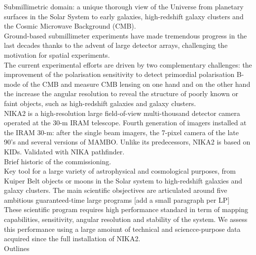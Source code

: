 
Submillimetric domain: a unique thorough view of the Universe from
planetary surfaces in the Solar System to early galaxies,
high-redshift galaxy clusters and the Cosmic Microwave
Background (CMB).\\

Ground-based submillimeter experiments have made tremendous progress in the last
decades thanks to the advent of large detector arrays, challenging the
motivation for spatial experiments.\\

The current experimental efforts are driven by two complementary
challenges: the improvement of the polarisation sensitivity to detect
primordial polarisation B-mode of the CMB and measure CMB lensing on
one hand and on the other hand the increase the angular resolution to
reveal the structure of poorly known or faint objects, such as
high-redshift galaxies and galaxy clusters.\\

NIKA2 is a high-resolution large field-of-view multi-thousand detector
camera operated at the 30-m IRAM telescope. Fourth generation of
imagers installed at the IRAM 30-m: after the single beam
imagers, the 7-pixel camera of the late 90's and several versions of
MAMBO. Unlike its predecessors, NIKA2 is based on KIDs. Validated with
NIKA pathfinder.\\

Brief historic of the commissioning. \\

Key tool for a large variety of astrophysical and cosmological
purposes, from Kuiper Belt objects or moons in the Solar system to
high-redshift galaxies and galaxy clusters. The main scientific
obsjectives are articulated around five ambitious guaranteed-time
large programs [add a small paragraph per LP]\\

These scientific program requires high performance standard in term of
mapping capabilities, sensitivity, angular resolution and stability of
the system. We assess this performance using a large amoiunt of
technical and sciencce-purpose data acquired since the full
installation of NIKA2.\\

Outlines













